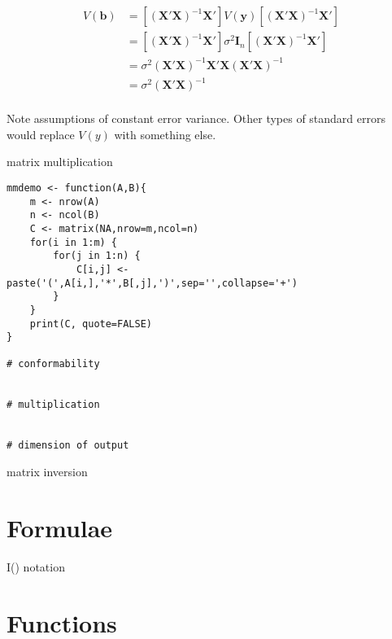 \documentclass[a4paper,12pt]{article}
\newcommand{\matr}[1]{\mathbf{#1}}
\begin{document}
\begin{align*}
V(\matr{b}) & = \left[(\matr{X}'\matr{X})^{-1}\matr{X}'\right] V(\matr{y}) \left[(\matr{X}'\matr{X})^{-1}\matr{X}'\right] \\
  & = \left[(\matr{X}'\matr{X})^{-1}\matr{X}'\right] \sigma^2 \matr{I}_n \left[(\matr{X}'\matr{X})^{-1}\matr{X}'\right] \\
  & = \sigma^2 (\matr{X}'\matr{X})^{-1}\matr{X}'\matr{X}(\matr{X}'\matr{X})^{-1}\\
  & = \sigma^2 (\matr{X}'\matr{X})^{-1}\\
\end{align*}

Note assumptions of constant error variance. Other types of standard errors would replace $V(y)$ with something else.









matrix multiplication

\begin{lstlisting}
mmdemo <- function(A,B){
    m <- nrow(A)
    n <- ncol(B)
    C <- matrix(NA,nrow=m,ncol=n)
    for(i in 1:m) {
        for(j in 1:n) {
            C[i,j] <- paste('(',A[i,],'*',B[,j],')',sep='',collapse='+')
        }
    }
    print(C, quote=FALSE)
}

# conformability


# multiplication


# dimension of output

\end{lstlisting}




matrix inversion













\clearpage
\section{Formulae}


I() notation




\clearpage
\section{Functions}
\end{document}
